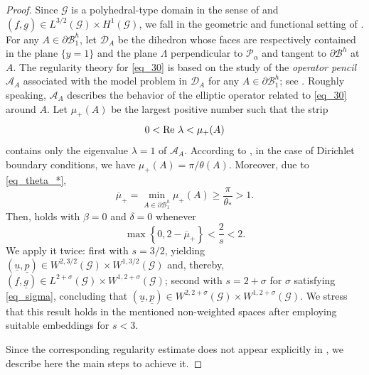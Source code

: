 \documentclass[11pt,a4paper]{amsart}
\theoremstyle{remark}
\theoremstyle{definition}
\numberwithin{equation}{section}
\numberwithin{proposition}{section}
\begin{document}
\begin{proof}
Since  $\mathcal{G}$ is a polyhedral-type domain in the sense of \cite[Section 4.1.1]{Mazya-Rossmann2010} and $(\underline{f},\underline{g})\in L^{3/2}(\mathcal{G})\times H^1(\mathcal{G})$, we fall in the geometric and functional setting of \cite[Theorem 11.2.8]{Mazya-Rossmann2010}. For any  $A\in\partial\mathcal{B}_1^h$, let $\mathcal{D}_A$ be the dihedron whose faces are respectively contained in the plane $\{y=1\}$ and the plane $\Lambda$ perpendicular to $\mathcal{P}_\alpha$ and tangent to $\partial\mathcal{B}^h$ at $A$. The regularity theory for \eqref{eq_30} is based on the study of the \emph{operator pencil} $\mathcal{A}_A$ associated with the model problem in $\mathcal{D}_A$ for any $A\in \partial \mathcal{B}_1^h$;
 see \cite[Section 2.3.1]{Mazya-Rossmann2010}. Roughly speaking, $\mathcal{A}_A$ describes the behavior of the elliptic operator related to \eqref{eq_30} around $A$.  Let
  $\mu_+(A)$ be the largest positive number such that the strip
 \begin{equation*}
0<{\rm Re}\ \lambda<\mu_+(A)
\end{equation*}
contains only the eigenvalue $\lambda=1$ of $\mathcal{A}_A$.  According to \cite[Section 11.1.2]{Mazya-Rossmann2010}, in the case of Dirichlet boundary conditions, we have $\mu_+(A)= \pi/\theta(A)$. Moreover, due to \eqref{eq_theta_*},
\begin{equation}\label{mu+}
\overline{\mu}_+=\min_{A\in\partial\mathcal{B}_1^h}\mu_+(A)\geq \frac{\pi}{\theta_*}>1.
\end{equation}
 Then, \cite[Theorem 11.2.8]{Mazya-Rossmann2010} holds with $\beta=0$ and $\delta=0$ whenever
\begin{equation}\label{eq_1}
\max\left\{0,2-\overline{\mu}_+\right\}<\frac{2}{s}< 2.
\end{equation}
 We apply it twice: first with $s=3/2$, yielding $(\underline{u},\underline{p})\in W^{2,3/2}(\mathcal{G})\times W^{1, 3/2}(\mathcal{G})$ and, thereby,  $(\underline{f},\underline{g})\in L^{2+\sigma}(\mathcal{G})\times W^{1, 2+\sigma}(\mathcal{G})$; second with $s=2+\sigma$ for $\sigma$ satisfying \eqref{eq_sigma}, concluding that $(\underline{u},\underline{p})\in W^{2,2+\sigma}(\mathcal{G})\times W^{1,2+\sigma}(\mathcal{G})$. We stress that this result holds in the mentioned non-weighted spaces after employing suitable embeddings for $s<3$. \par
Since the corresponding regularity estimate does not appear explicitly in \cite[Theorem 11.2.8]{Mazya-Rossmann2010}, we describe here the main steps to achieve it.


\end{proof}
\end{document}

